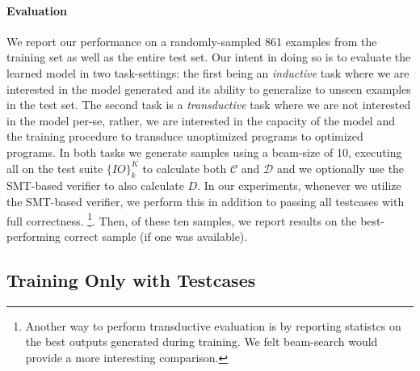 \documentclass{article}
\begin{document}

\paragraph{Evaluation}

We report our performance on a randomly-sampled 861 examples from the training set as well as the entire test set. Our intent in doing so is to evaluate the learned model in two task-settings: the first being an \textit{inductive} task where we are interested in the model generated and its ability to generalize to unseen examples in the test set. The second task is a \textit{transductive} task where we are not interested in the model per-se, rather, we are interested in the capacity of the model and the training procedure to transduce unoptimized programs to optimized programs. In both tasks we generate samples using a beam-size of 10, executing all on the test suite $\{IO\}_{k}^K$ to calculate both $\mathcal{C}$  and $\mathcal{D}$ and we optionally use the SMT-based verifier to also calculate $D$. In our experiments, whenever we utilize the SMT-based verifier, we perform this in addition to passing all testcases with full correctness. \footnote{Another way to perform transductive evaluation is by reporting statistcs on the best outputs generated during training. We felt beam-search would provide a more interesting comparison.}. Then, of these ten samples, we report results on the best-performing correct sample (if one was available). 


\subsection{Training Only with Testcases}
\end{document}
